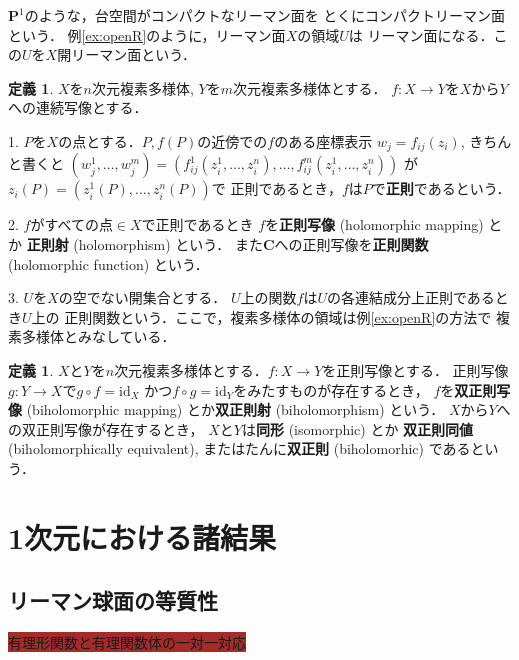 \documentclass[11pt, a4paper, dvipdfmx, draft]{jsarticle}
\theoremstyle{definition}
\newtheorem{Definition}[Axiom]{定義}
\newcommand{\cc}{\mathbf{C}}
\newcommand{\pp}{\mathbf{P}}
\newcommand{\id}{\mathrm{id}}
\theoremstyle{mystyle}
\numberwithin{equation}{section} %
\begin{document}
$\pp^1$のような，台空間がコンパクトなリーマン面を
とくにコンパクトリーマン面という．
例\ref{ex:openR}のように，リーマン面$X$の領域$U$は
リーマン面になる．この$U$を$X$開リーマン面という．

\begin{Definition}
    $X$を$n$次元複素多様体, $Y$を$m$次元複素多様体とする．
    $f\colon X\to Y$を$X$から$Y$への連続写像とする．
    
    1. 
    $P$を$X$の点とする．$P, f(P)$の近傍での$f$のある座標表示
    $w_j=f_{ij}(z_i)$, きちんと書くと
    $(w_{j}^{1},\dots,w_{j}^{m})
    =\left(f_{ij}^{1}(z_{i}^{1},\dots,z_{i}^{n}),\dots,f_{ij}^{m}(z_{i}^{1},\dots,z_{i}^{n})\right)$
    が$z_i(P)=(z_{i}^{1}(P),\dots,z_{i}^{n}(P))$で
    正則であるとき，$f$は$P$で\textbf{正則}であるという．
    
    2. 
    $f$がすべての点$\in X$で正則であるとき
    $f$を\textbf{正則写像} (holomorphic mapping) とか
    \textbf{正則射} (holomorphism) という．
    また$\cc$への正則写像を\textbf{正則関数} (holomorphic 
    function) という．

    3. 
    $U$を$X$の空でない開集合とする．
    $U$上の関数$f$は$U$の各連結成分上正則であるとき$U$上の
    正則関数という．ここで，複素多様体の領域は例\ref{ex:openR}の方法で
    複素多様体とみなしている．
\end{Definition}

\begin{Definition}
    $X$と$Y$を$n$次元複素多様体とする．$f\colon X\to Y$を正則写像とする．
    正則写像$g\colon Y\to X$で$g\circ f=\id_X$
    かつ$f\circ g=\id_Y$をみたすものが存在するとき，
    $f$を\textbf{双正則写像} (biholomorphic mapping) とか\textbf{双正則射} (biholomorphism) という．
    $X$から$Y$への双正則写像が存在するとき，
    $X$と$Y$は\textbf{同形} (isomorphic) とか 
    \textbf{双正則同値} (biholomorphically equivalent), 
    またはたんに\textbf{双正則} (biholomorhic) であるという．
\end{Definition}

\section{1次元における諸結果}

\subsection{リーマン球面の等質性}

\colorbox{brown}{有理形関数と有理関数体の一対一対応}
\end{document}
